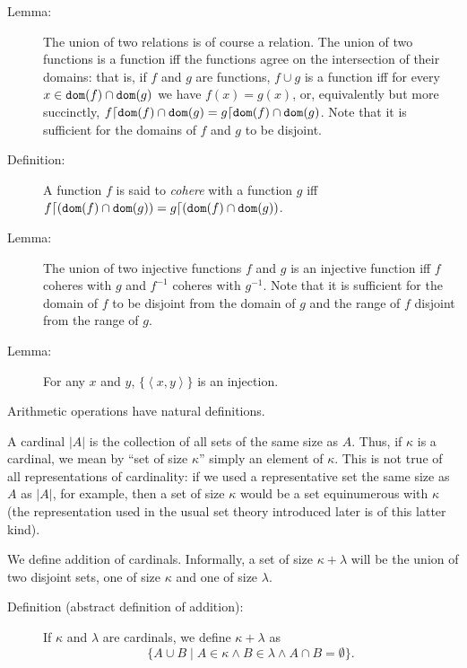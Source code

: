 \documentclass[12pt]{book}
\begin{document}
\begin{description}

\item[Lemma:] The union of two relations is of course a relation.  The
union of two functions is a function iff the functions agree on the
intersection of their domains: that is, if $f$ and $g$ are functions,
$f \cup g$ is a function iff for every $x \in {\tt dom}(f) \cap {\tt
dom}(g)$ we have $f(x)=g(x)$, or, equivalently but more succinctly, $f
\lceil {\tt dom}(f) \cap {\tt dom}(g) = g \lceil {\tt dom}(f) \cap
{\tt dom}(g)$.  Note that it is sufficient for the domains of $f$ and
$g$ to be disjoint.

\item[Definition:] A function $f$ is said to {\em cohere\/} with a
function $g$ iff $f \lceil( {\tt dom}(f) \cap {\tt dom}(g)) = g \lceil
({\tt dom}(f) \cap {\tt dom}(g))$.

\item[Lemma:] The union of two injective functions $f$ and $g$ is an
injective function iff $f$ coheres with $g$ and $f^{-1}$ coheres with
$g^{-1}$.  Note that it is sufficient for the domain of $f$ to be
disjoint from the domain of $g$ and the range of $f$ disjoint from
the range of $g$.

\item[Lemma:] For any $x$ and $y$, $\{\left<x,y\right>\}$ is an
injection.

\end{description}

Arithmetic operations have natural definitions.

A cardinal $|A|$ is the collection of all sets of the same size as
$A$.  Thus, if $\kappa$ is a cardinal, we mean by ``set of size
$\kappa$'' simply an element of $\kappa$.  This is not true of all
representations of cardinality: if we used a representative set the
same size as $A$ as $|A|$, for example, then a set of size $\kappa$
would be a set equinumerous with $\kappa$ (the representation used in
the usual set theory introduced later is of this latter kind).

We define addition of cardinals.  Informally, a set of size
$\kappa+\lambda$ will be the union of two disjoint sets, one of size
$\kappa$ and one of size $\lambda$.

\begin{description}

\item[Definition (abstract definition of addition):] If $\kappa$ and $\lambda$ are
cardinals, we define $\kappa+\lambda$ as $$\{A \cup B \mid A \in
\kappa \wedge B \in \lambda \wedge A \cap B = \emptyset\}.$$

\end{description}
\end{document}

